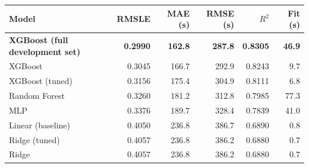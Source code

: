 \begin{tabular}{@{}lrrrrr@{}}
\toprule
Model & RMSLE & MAE (s) & RMSE (s) & $R^2$ & Fit (s) \\
\midrule
\textbf{XGBoost (full development set)} & \textbf{0.2990} & \textbf{162.8} & \textbf{287.8} & \textbf{0.8305} & \textbf{46.9} \\
XGBoost & 0.3045 & 166.7 & 292.9 & 0.8243 & 9.7 \\
XGBoost (tuned) & 0.3156 & 175.4 & 304.9 & 0.8111 & 6.8 \\
Random Forest & 0.3260 & 181.2 & 312.8 & 0.7985 & 77.3 \\
MLP & 0.3376 & 189.7 & 328.4 & 0.7839 & 41.0 \\
Linear (baseline) & 0.4050 & 236.8 & 386.7 & 0.6890 & 0.8 \\
Ridge (tuned) & 0.4057 & 236.8 & 386.2 & 0.6880 & 0.7 \\
Ridge & 0.4057 & 236.8 & 386.2 & 0.6880 & 0.7 \\
\bottomrule
\end{tabular}
